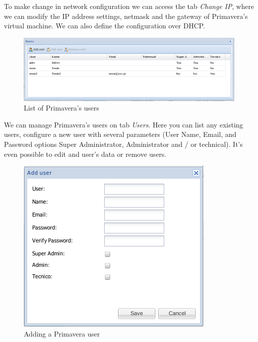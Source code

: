 To make change in network configuration we can access the tab \textit{Change IP}, where we can modify the IP address settings, netmask and the gateway of Primavera's virtual machine. 
We can also define the configuration over DHCP.

\begin{figure}[H]
    \begin{center}
    \includegraphics[scale=0.6]{screenshots/primavera/primaverainterface_07.png}
    \caption{List of Primavera's users}
    \label{fig:primavera_list_users}
    \end{center}
\end{figure}

We can manage Primavera's users on tab \textit{Users}.
Here you can list any existing users, configure a new user with several parameters (User Name, Email, and Password options Super Administrator, Administrator and / or technical). It's even possible to edit and user's data or remove users.

\begin{figure}[H]
    \begin{center}
    \includegraphics[scale=0.6]{screenshots/primavera/primaverainterface_08.png}
    \caption{Adding a Primavera user}
    \label{fig:primavera_add_user}
    \end{center}
\end{figure}

